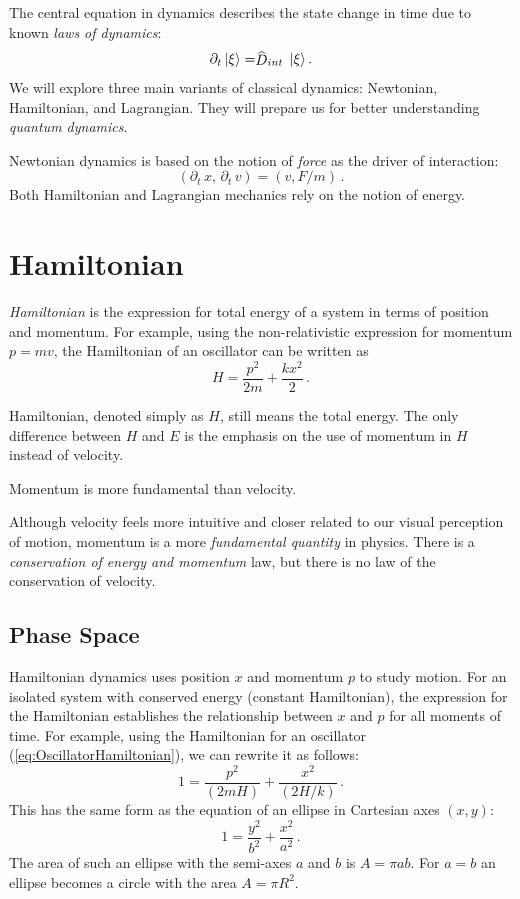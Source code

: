The central equation in dynamics describes the state change in time due to known \emph{laws of dynamics}:
\[
\partial_t\,\ket{\xi}=\op{D}_{int}\,\ket{\xi}\,.
\]
We will explore three main variants of classical dynamics: Newtonian, Hamiltonian, and Lagrangian. They will prepare us for better understanding \emph{quantum dynamics}.

Newtonian dynamics is based on the notion of \emph{force} as the driver of interaction:
\[
(\partial_t\,x,\,\partial_t\, v)=(v, F/m)\,.
\]
Both Hamiltonian and Lagrangian mechanics rely on the notion of energy. 

\section{Hamiltonian}\label{sec:Hamiltonian}
\emph{Hamiltonian} is the expression for total energy of a system in terms of position and momentum. For example, using the non-relativistic expression for momentum $p=mv$, the Hamiltonian of  an oscillator can be written as
\begin{equation}
	H = \frac{p^2}{2m} + \frac{kx^2}{2}\,.
	\label{eq:OscillatorHamiltonian}
\end{equation}

Hamiltonian, denoted simply as $H$, still means the total energy. The only difference between $H$ and $E$  is the emphasis on the use of momentum in $H$ instead of velocity.

\begin{important}
	Momentum is more fundamental than velocity.
\end{important}

Although velocity feels more intuitive and closer related to our visual perception of motion, momentum is a more \emph{fundamental quantity} in physics. There is a \emph{conservation of energy and momentum} law, but there is no law of the conservation of velocity.

\subsection{Phase Space}\label{subsec:PhaseSpace}
Hamiltonian dynamics uses position $x$  and momentum $p$  to study motion. For an isolated system with conserved energy (constant Hamiltonian), the expression for the Hamiltonian establishes the relationship between $x$ and $p$  for all moments of time. For example, using the Hamiltonian for an oscillator (\ref{eq:OscillatorHamiltonian}), we can rewrite it as follows:
\begin{equation}
	1=\frac{p^2}{(2mH)}+\frac{x^2}{(2H/k)}\,.
	\label{eq:phaseSpaceEllipse}
\end{equation}
This has the same form as the equation of an ellipse in Cartesian axes $(x,y)$:
\[
1=\frac{y^2}{b^2}+\frac{x^2}{a^2}\,.
\]
The area of such an ellipse with the semi-axes $a$ and $b$ is $A=\pi ab$. For $a=b$ an ellipse becomes a circle with the area $A=\pi R^2$.

